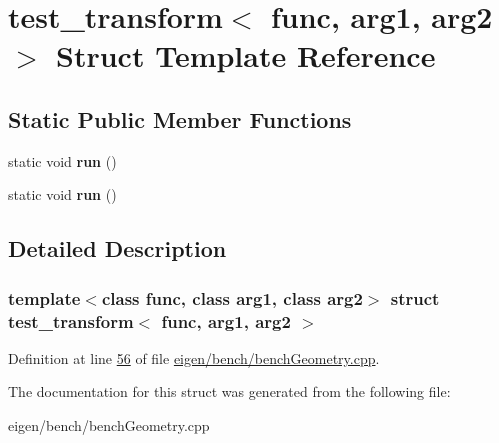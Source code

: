 \hypertarget{structtest__transform}{}\section{test\+\_\+transform$<$ func, arg1, arg2 $>$ Struct Template Reference}
\label{structtest__transform}
\subsection*{Static Public Member Functions}
\begin{DoxyCompactItemize}
\item 
\mbox{\label{structtest__transform_a0c075937ba4ae1e5a6b1ee321e261e59}} 
static void {\bfseries run} ()
\item 
\mbox{\label{structtest__transform_a0c075937ba4ae1e5a6b1ee321e261e59}} 
static void {\bfseries run} ()
\end{DoxyCompactItemize}


\subsection{Detailed Description}
\subsubsection*{template$<$class func, class arg1, class arg2$>$\newline
struct test\+\_\+transform$<$ func, arg1, arg2 $>$}



Definition at line \hyperlink{eigen_2bench_2bench_geometry_8cpp_source_l00056}{56} of file \hyperlink{eigen_2bench_2bench_geometry_8cpp_source}{eigen/bench/bench\+Geometry.\+cpp}.



The documentation for this struct was generated from the following file\+:\begin{DoxyCompactItemize}
\item 
eigen/bench/bench\+Geometry.\+cpp\end{DoxyCompactItemize}
